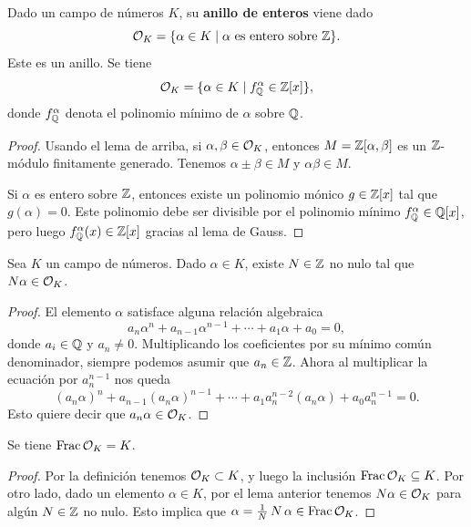 \begin{proposicion-definicion}
  Dado un campo de números $K$, su \textbf{anillo de enteros} viene dado
  $$\mathcal{O}_K = \{ \alpha \in K \mid \alpha\text{ es entero sobre }\mathbb{Z} \}.$$
  Este es un anillo. Se tiene
  $$\mathcal{O}_K = \{ \alpha \in K \mid f_{\mathbb{Q}}^\alpha \in \mathbb{Z} [x] \},$$
  donde $f_{\mathbb{Q}}^\alpha$ denota el polinomio mínimo de $\alpha$ sobre $\mathbb{Q}$.

  \begin{proof}
    Usando el lema de arriba, si $\alpha,\beta \in \mathcal{O}_K$, entonces
    $M = \mathbb{Z} [\alpha,\beta]$ es un $\mathbb{Z}$-módulo finitamente generado. Tenemos
    $\alpha\pm\beta \in M$ y $\alpha\beta \in M$.

    Si $\alpha$ es entero sobre $\mathbb{Z}$, entonces existe un polinomio mónico
    $g \in \mathbb{Z} [x]$ tal que $g (\alpha) = 0$. Este polinomio debe ser
    divisible por el polinomio mínimo $f_{\mathbb{Q}}^\alpha \in \mathbb{Q} [x]$, pero luego
    $f_{\mathbb{Q}}^\alpha (x) \in \mathbb{Z} [x]$ gracias al lema de Gauss.
  \end{proof}
\end{proposicion-definicion}


\begin{lema}
  \label{lema:N-alpha-esta-en-OK}
  Sea $K$ un campo de números. Dado $\alpha \in K$, existe $N \in \mathbb{Z}$ no nulo
  tal que $N\alpha \in \mathcal{O}_K$.

  \begin{proof}
    El elemento $\alpha$ satisface alguna relación algebraica
    $$a_n \alpha^n + a_{n-1} \alpha^{n-1} + \cdots + a_1 \alpha + a_0 = 0,$$   
    donde $a_i \in \mathbb{Q}$ y $a_n \ne 0$. Multiplicando los coeficientes por su
    mínimo común denominador, siempre podemos asumir que $a_n \in \mathbb{Z}$. Ahora
    al multiplicar la ecuación por $a_n^{n-1}$ nos queda
    \[ (a_n \alpha)^n + a_{n-1} (a_n \alpha)^{n-1} + \cdots +
           a_1 a_n^{n-2} (a_n \alpha) + a_0 a_n^{n-1} = 0. \]
    Esto quiere decir que $a_n \alpha \in \mathcal{O}_K$.
  \end{proof}
\end{lema}

\begin{proposicion}
  Se tiene $\operatorname{Frac}\mathcal{O}_K = K$.

  \begin{proof}
    Por la definición tenemos $\mathcal{O}_K \subset K$, y luego la inclusión
    $\operatorname{Frac} \mathcal{O}_K \subseteq K$. Por otro lado, dado un elemento $\alpha \in K$,
    por el lema anterior tenemos $N\alpha \in \mathcal{O}_K$ para algún $N \in \mathbb{Z}$
    no nulo. Esto implica que $\alpha = \frac{1}{N}\,N\,\alpha \in \operatorname{Frac}\mathcal{O}_K$.
  \end{proof}
\end{proposicion}

